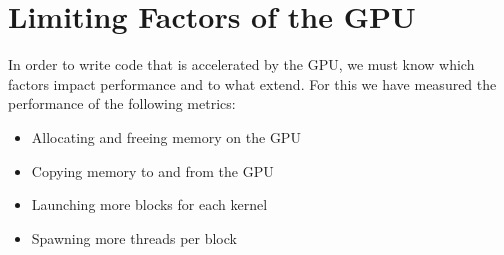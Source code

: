 \section{Limiting Factors of the GPU}

In order to write code that is accelerated by the GPU, we must know which factors impact performance and to what extend. 
For this we have measured the performance of the following metrics: 

\begin{itemize}
    \item Allocating and freeing memory on the GPU
    \item Copying memory to and from the GPU
    \item Launching more blocks for each kernel
    \item Spawning more threads per block
\end{itemize}

